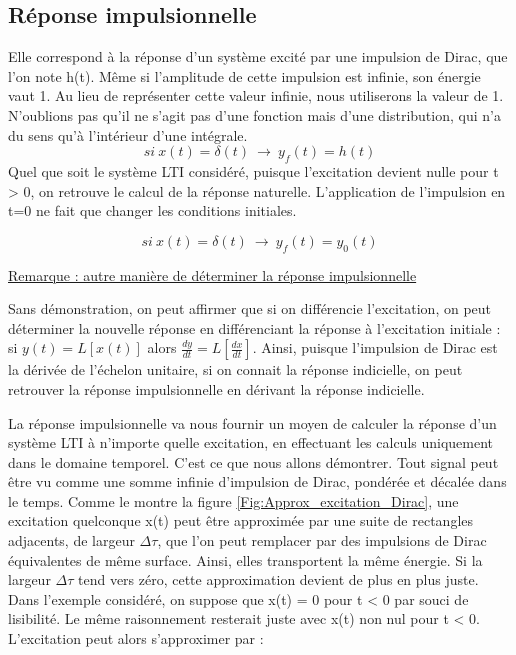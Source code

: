 \documentclass[]{book}
\begin{document}
{	\subsection{Réponse impulsionnelle}
	Elle correspond à la réponse d'un système excité par une impulsion de Dirac, que l'on note h(t). Même si l'amplitude de cette impulsion est infinie, son énergie vaut 1. Au lieu de représenter cette valeur infinie, nous utiliserons la valeur de 1. N'oublions pas qu'il ne s'agit pas d'une fonction mais d'une distribution, qui n'a du sens qu'à l'intérieur d'une intégrale.
	\begin{equation}\label{key}
	si~x(t)=\delta (t)~\rightarrow ~y_{f}(t)=h(t)
	\end{equation}
	Quel que soit le système LTI considéré, puisque l'excitation devient nulle pour t > 0, on retrouve le calcul de la réponse naturelle. L'application de l'impulsion en t=0 ne fait que changer les conditions initiales.
	
	\begin{equation}\label{}
	si~x(t)=\delta (t)~\rightarrow ~y_{f}(t) = y_{0}(t)	 	
	\end{equation}
	
	\underline{Remarque : autre manière de déterminer la réponse impulsionnelle}
	
	Sans démonstration, on peut affirmer que si on différencie l'excitation, on peut déterminer la nouvelle réponse en différenciant la réponse à l'excitation initiale : si $y(t) = L[x(t)]$ alors $\frac{dy}{dt} = L[\frac{dx}{dt}] $.
	Ainsi, puisque l'impulsion de Dirac est la dérivée de l'échelon unitaire, si on connait la réponse indicielle, on peut retrouver la réponse impulsionnelle en dérivant la réponse indicielle.
	
	\vspace{1\baselineskip}
	La réponse impulsionnelle va nous fournir un moyen de calculer la
	réponse d'un système LTI à n'importe quelle excitation, en effectuant
	les calculs uniquement dans le domaine temporel. C'est ce que nous
	allons démontrer. Tout signal peut être vu comme une somme infinie
	d'impulsion de Dirac, pondérée et décalée dans le temps. Comme le montre
	la figure \ref{Fig:Approx_excitation_Dirac}, une excitation quelconque x(t) peut être
	approximée par une suite de rectangles adjacents, de largeur $ \Delta \tau $, que
	l'on peut remplacer par des impulsions de Dirac équivalentes de même
	surface. Ainsi, elles transportent la même énergie. Si la largeur $ \Delta \tau $
	tend vers zéro, cette approximation devient de plus en plus juste. Dans
	l'exemple considéré, on suppose que x(t) = 0 pour t \textless{} 0 par
	souci de lisibilité. Le même raisonnement resterait juste avec x(t) non
	nul pour t \textless{} 0. L'excitation peut alors s'approximer par :
	
}
\end{document}

